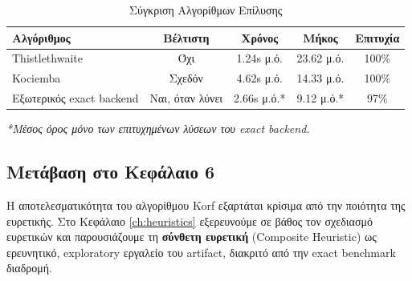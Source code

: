 \begin{table}[htbp]
\centering
\caption{Σύγκριση Αλγορίθμων Επίλυσης}
\label{tab:algorithm_comparison}
\begin{tabular}{|l|c|c|c|c|}
\hline
\textbf{Αλγόριθμος} & \textbf{Βέλτιστη} & \textbf{Χρόνος} & \textbf{Μήκος} & \textbf{Επιτυχία} \\
\hline
Thistlethwaite & Όχι & 1.24s μ.ό. & 23.62 μ.ό. & 100\% \\
Kociemba & Σχεδόν & 4.62s μ.ό. & 14.33 μ.ό. & 100\% \\
Εξωτερικός exact backend & Ναι, όταν λύνει & 2.66s μ.ό.* & 9.12 μ.ό.* & 97\% \\
\hline
\end{tabular}
\end{table}
\textit{*Μέσος όρος μόνο των επιτυχημένων λύσεων του exact backend.}

\subsection{Μετάβαση στο Κεφάλαιο 6}

Η αποτελεσματικότητα του αλγορίθμου Korf εξαρτάται κρίσιμα από την ποιότητα της ευρετικής. Στο Κεφάλαιο \ref{ch:heuristics} εξερευνούμε σε βάθος τον σχεδιασμό ευρετικών και παρουσιάζουμε τη \textbf{σύνθετη ευρετική} (Composite Heuristic) ως ερευνητικό, exploratory εργαλείο του artifact, διακριτό από την exact benchmark διαδρομή.
